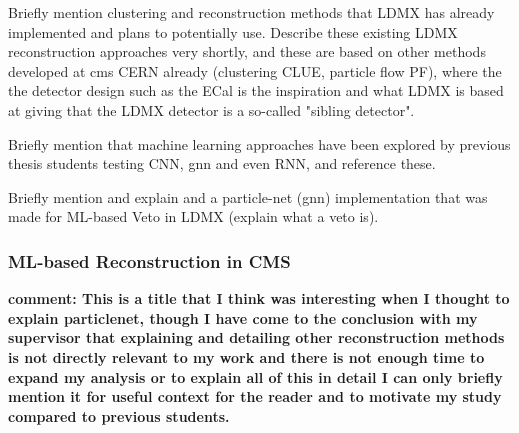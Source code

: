 Briefly mention clustering and reconstruction methods that LDMX has already implemented and plans to potentially use. Describe these existing LDMX reconstruction approaches very shortly, and these are based on other methods developed at \gls{cms} CERN already (clustering CLUE, particle flow PF), where the the detector design such as the ECal is the inspiration and what LDMX is based at giving that the LDMX detector is a so-called "sibling detector".

Briefly mention that machine learning approaches have been explored by previous thesis students testing CNN, \gls{gnn} and even RNN, and reference these.

Briefly mention and explain and a particle-net (\gls{gnn}) implementation that was made for ML-based Veto in LDMX (explain what a veto is).


\subsubsection{ML-based Reconstruction in CMS}

\textbf{comment: This is a title that I think was interesting when I thought to explain particlenet, though I have come to the conclusion with my supervisor that explaining and detailing other reconstruction methods is not directly relevant to my work and there is not enough time to expand my analysis or to explain all of this in detail I can only briefly mention it for useful context for the reader and to motivate my study compared to previous students.}
